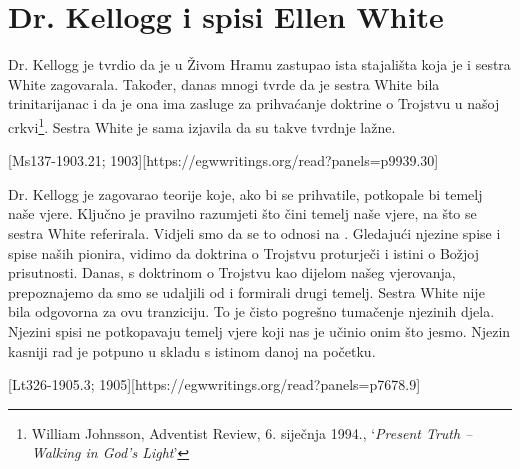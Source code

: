 \chapter{Dr. Kellogg i spisi Ellen White}

Dr. Kellogg je tvrdio da je u Živom Hramu zastupao ista stajališta koja je i sestra White zagovarala. Također, danas mnogi tvrde da je sestra White bila trinitarijanac i da je ona ima zasluge za prihvaćanje doktrine o Trojstvu u našoj crkvi\footnote{William Johnsson, Adventist Review, 6. siječnja 1994., ‘\textit{Present Truth –Walking in God's Light}’}. Sestra White je sama izjavila da su takve tvrdnje lažne.

[Ms137-1903.21; 1903][https://egwwritings.org/read?panels=p9939.30]

Dr. Kellogg je zagovarao teorije koje, ako bi se prihvatile, potkopale bi temelj naše vjere. Ključno je pravilno razumjeti što čini temelj naše vjere, na što se sestra White referirala. Vidjeli smo da se to odnosi na . Gledajući njezine spise i spise naših pionira, vidimo da doktrina o Trojstvu proturječi  i istini o Božjoj prisutnosti. Danas, s doktrinom o Trojstvu kao dijelom našeg vjerovanja, prepoznajemo da smo se udaljili od  i formirali drugi temelj. Sestra White nije bila odgovorna za ovu tranziciju. To je čisto pogrešno tumačenje njezinih djela. Njezini spisi ne potkopavaju temelj vjere koji nas je učinio onim što jesmo. Njezin kasniji rad je potpuno u skladu s istinom danoj na početku.

[Lt326-1905.3; 1905][https://egwwritings.org/read?panels=p7678.9]

